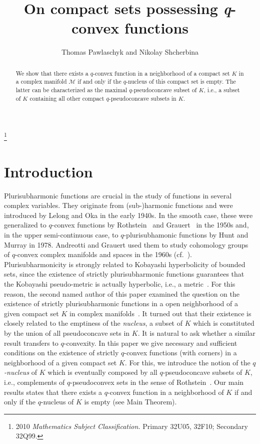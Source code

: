 \documentclass[11pt,a4paper]{article}
\date{}
\author{Thomas Pawlaschyk and Nikolay Shcherbina}
\title{On compact sets possessing \textit{q}-convex functions}
\newcommand{\Mcal}{\mathcal{M}}
\begin{document}
\maketitle





\begin{abstract}We show that there exists a $q$-convex function in a neighborhood of a compact set $K$ in a complex manifold $\Mcal$ if and only if the $q$-nucleus of this compact set is empty. The latter can be characterized as the maximal $q$-pseudoconcave subset of $K$, i.e., a subset of $K$ containing all other compact $q$-pseudoconcave subsets in $K$.
\end{abstract}


%
%
\renewcommand{\thefootnote}{}\footnote{2010 \textit{Mathematics Subject Classification.} Primary 32U05, 32F10; Secondary 32Q99.}



\section{Introduction}

Plurisubharmonic functions are crucial in the study of functions in several complex variables. They originate from (sub-)harmonic functions and were introduced by Lelong and Oka in the early 1940s. In the smooth case, these were generalized to $q$-convex functions by Rothstein~\cite{Ro} and Grauert~\cite{Gr} in the 1950s and, in the upper semi-continuous case, to $q$-plurisubhamonic functions by Hunt and Murray \cite{HM} in 1978. Andreotti and Grauert used them to study cohomology groups of $q$-convex complex manifolds and spaces in the 1960s (cf.~\cite{HL}).
Plurisubharmonicity is strongly related to Kobayashi hyperbolicity of bounded sets, since the existence of strictly plurisubharmonic functions guarantees that the Kobayashi pseudo-metric is actually hyperbolic, i.e., a metric~\cite{Koba}. For this reason, the second named author of this paper examined the question on the existence of strictly plurisubharmonic functions in a open neighborhood of a given compact set $K$ in complex manifolds~\cite{Shc21}. It turned out that their existence is closely related to the emptiness of the \emph{nucleus}, a subset of $K$ which is constituted by the union of all pseudoconcave sets in $K$.
It is natural to ask whether a similar result transfers to $q$-convexity. In this paper we give necessary and sufficient conditions on the existence of strictly $q$-convex functions (with corners) in a neighborhood of a given compact set $K$. For this, we introduce the notion of the \emph{$q$-nucleus} of $K$ which is eventually composed by all $q$-pseudoconcave subsets of $K$, i.e., complements of $q$-pseudoconvex sets in the sense of Rothstein~\cite{Ro}. Our main results states that there exists a $q$-convex function in a neighborhood of $K$ if and only if the $q$-nucleus of $K$ is empty (see Main Theorem).
\end{document}
